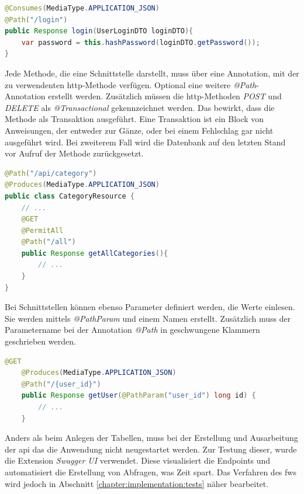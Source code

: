 \begin{lstlisting}[label=lst:consmes, language=Java, caption=@Consumes Ausschnitt von UserResource]
@Consumes(MediaType.APPLICATION_JSON)
@Path("/login")
public Response login(UserLoginDTO loginDTO){
    var password = this.hashPassword(loginDTO.getPassword());
}
\end{lstlisting}

Jede Methode, die eine Schnittstelle darstellt, muss über eine Annotation, mit der zu verwendenten \gls{http}-Methode verfügen. 
Optional eine weitere \emph{@Path}-Annotation erstellt werden. 
Zusätzlich müssen die \gls{http}-Methoden \emph{POST} und \emph{DELETE} als \emph{@Transactional} gekennzeichnet werden. 
Das bewirkt, dass die Methode als Transaktion ausgeführt. 
Eine Transaktion ist ein Block von Anweisungen, der entweder zur Gänze, oder bei einem Fehlschlag gar nicht ausgeführt wird. 
Bei zweiterem Fall wird die Datenbank auf den letzten Stand vor Aufruf der Methode zurückgesetzt. 
\cite{TransactionAbout}

\begin{lstlisting}[label=lst:resourceClass, language=Java, caption=Anfang einer Resource Datei]
@Path("/api/category")
@Produces(MediaType.APPLICATION_JSON)
public class CategoryResource {
    // ...
    @GET
    @PermitAll
    @Path("/all")
    public Response getAllCategories(){
        // ...
    }
}
\end{lstlisting}

Bei Schnittstellen können ebenso Parameter definiert werden, die Werte einlesen. 
Sie werden mittels \emph{@PathParam} und einem Namen erstellt. 
Zusätzlich muss der Parametername bei der Annotation \emph{@Path} in geschwungene Klammern geschrieben werden. 

\begin{lstlisting}[label=lst:getUserEndpoint, language=Java, caption=Abfrage eines Users]
    @GET
    @Produces(MediaType.APPLICATION_JSON)
    @Path("/{user_id}")
    public Response getUser(@PathParam("user_id") long id) {
        // ...
    }
\end{lstlisting}

Anders als beim Anlegen der Tabellen, muss bei der Erstellung und Ausarbeitung der \gls{api} das die Anwendung nicht neugestartet werden. 
Zur Testung dieser, wurde die Extension \emph{Swagger UI} verwendet. 
Diese visualisiert die Endpoints und automatisiert die Erstellung von Abfragen, was Zeit spart.
Das Verfahren des \gls{fw}s wird jedoch in Abschnitt \ref{chapter:implementation:tests} näher bearbeitet. 

